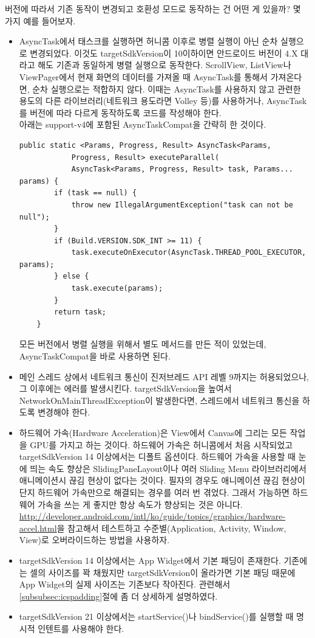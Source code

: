 버전에 따라서 기존 동작이 변경되고 호환성 모드로 동작하는 건 어떤 게 있을까? 몇 가지 예를 들어보자.
\begin{itemize}
\item AsyncTask에서 태스크를 실행하면 허니콤 이후로 병렬 실행이 아닌 순차 실행으로 변경되었다. 이것도 targetSdkVersion이 10이하이면 안드로이드 버전이 4.X 대라고 해도 기존과 동일하게 병렬 실행으로 동작한다. ScrollView, ListView나  ViewPager에서 현재 화면의 데이터를 가져올 때 AsyncTask를 통해서 가져온다면, 순차 실행으로는 적합하지 않다. 이때는  AsyncTask를 사용하지 않고 관련한 용도의 다른 라이브러리(네트워크 용도라면 Volley 등)를 사용하거나, AsyncTask를 버전에 따라 다르게 동작하도록 코드를 작성해야 한다.\\

아래는 support-v4에 포함된 AsyncTaskCompat을 간략히 한 것이다.
\begin{lstlisting}[frame=single]
	public static <Params, Progress, Result> AsyncTask<Params,
			Progress, Result> executeParallel(
            AsyncTask<Params, Progress, Result> task, Params... params) {
        if (task == null) {
            throw new IllegalArgumentException("task can not be null");
        }
        if (Build.VERSION.SDK_INT >= 11) {
            task.executeOnExecutor(AsyncTask.THREAD_POOL_EXECUTOR, params);
        } else {
            task.execute(params);
        }
        return task;
    }
\end{lstlisting}
모든 버전에서 병렬 실행을 위해서 별도 메서드를 만든 적이 있었는데, AsyncTaskCompat을 바로 사용하면 된다.

\item 메인 스레드 상에서 네트워크 통신이 진저브레드 API 레벨 9까지는 허용되었으나, 그 이후에는 에러를 발생시킨다. targetSdkVersion을 높여서 NetworkOnMainThreadException이 발생한다면, 스레드에서 네트워크 통신을 하도록 변경해야 한다.
\item 하드웨어 가속(Hardware Acceleration)은 View에서 Canvas에 그리는 모든 작업을 GPU를 가지고 하는 것이다. 하드웨어 가속은 허니콤에서 처음 시작되었고 targetSdkVersion 14 이상에서는 디폴트 옵션이다. 하드웨어 가속을 사용할 때 눈에 띄는 속도 향상은 SlidingPaneLayout이나 여러 Sliding Menu 라이브러리에서 애니메이션시 끊김 현상이 없다는 것이다. 
필자의 경우도 애니메이션 끊김 현상이 단지 하드웨어 가속만으로 해결되는 경우를 여러 번 겪었다.
그래서 가능하면 하드웨어 가속을 쓰는 게 좋지만 항상 속도가 향상되는 것은 아니다. \url{http://developer.android.com/intl/ko/guide/topics/graphics/hardware-accel.html}을 참고해서 테스트하고 수준별(Application, Activity, Window, View)로 오버라이드하는 방법을 사용하자.
\item targetSdkVersion 14 이상에서는 App Widget에서 기본 패딩이 존재한다. 기존에는 셀의 사이즈를 꽉 채웠지만 targetSdkVersion이 올라가면 기본 패딩 때문에 App Widget의 실제 사이즈는 기존보다 작아진다. 관련해서 \ref{subsubsec:icspadding}절에 좀 더 상세하게 설명하였다.
\item targetSdkVersion 21 이상에서는 startService()나 bindService()를 실행할 때 명시적 인텐트를 사용해야 한다.
\end{itemize}


